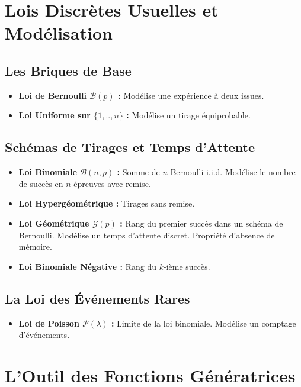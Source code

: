\documentclass[12pt, a4paper, parskip=full]{report}
\theoremstyle{agregstyle}
\begin{document}
\section{Lois Discrètes Usuelles et Modélisation}
\subsection{Les Briques de Base}
\begin{itemize}
    \item \textbf{Loi de Bernoulli $\mathcal{B}(p)$ :} Modélise une expérience à deux issues.
    \item \textbf{Loi Uniforme sur $\{1,..,n\}$ :} Modélise un tirage équiprobable.
\end{itemize}
\subsection{Schémas de Tirages et Temps d'Attente}
\begin{itemize}
    \item \textbf{Loi Binomiale $\mathcal{B}(n,p)$ :} Somme de $n$ Bernoulli i.i.d. Modélise le nombre de succès en $n$ épreuves avec remise.
    \item \textbf{Loi Hypergéométrique :} Tirages sans remise.
    \item \textbf{Loi Géométrique $\mathcal{G}(p)$ :} Rang du premier succès dans un schéma de Bernoulli. Modélise un temps d'attente discret. Propriété d'absence de mémoire.
    \item \textbf{Loi Binomiale Négative :} Rang du $k$-ième succès.
\end{itemize}
\subsection{La Loi des Événements Rares}
\begin{itemize}
    \item \textbf{Loi de Poisson $\mathcal{P}(\lambda)$ :} Limite de la loi binomiale. Modélise un comptage d'événements.
\end{itemize}

\section{L'Outil des Fonctions Génératrices}
\end{document}
